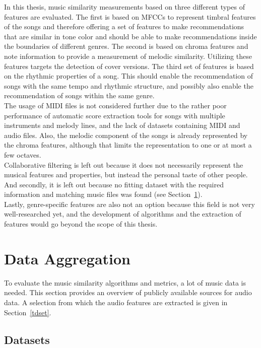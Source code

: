 In this thesis, music similarity measurements based on three different types of features are evaluated. The first is based on MFCCs to represent timbral features of the songs and therefore offering a set of features to make recommendations that are similar in tone color and should be able to make recommendations inside the boundaries of different genres. The second is based on chroma features and note information to provide a measurement of melodic similarity. Utilizing these features targets the detection of cover versions. The third set of features is based on the rhythmic properties of a song. This should enable the recommendation of songs with the same tempo and rhythmic structure, and possibly also enable the recommendation of songs within the same genre.\\
The usage of MIDI files is not considered further due to the rather poor performance of automatic score extraction tools for songs with multiple instruments and melody lines, and the lack of datasets containing MIDI and audio files. Also, the melodic component of the songs is already represented by the chroma features, although that limits the representation to one or at most a few octaves.\\
Collaborative filtering is left out because it does not necessarily represent the musical features and properties, but instead the personal taste of other people. And secondly, it is left out because no fitting dataset with the required information and matching music files was found (see Section~\ref{data}).\\
Lastly, genre-specific features are also not an option because this field is not very well-researched yet, and the development of algorithms and the extraction of features would go beyond the scope of this thesis.

\section{Data Aggregation}\label{data}

To evaluate the music similarity algorithms and metrics, a lot of music data is needed. This section provides an overview of publicly available sources for audio data. A selection from which the audio features are extracted is given in Section~\ref{tdset}.

\subsection{Datasets}\label{datasets}

